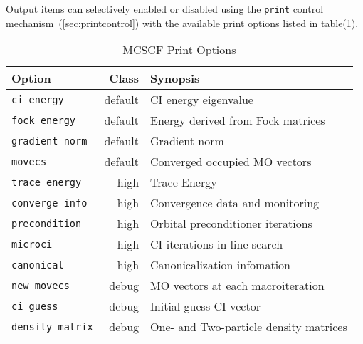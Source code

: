 Output items can selectively enabled or disabled using the
\verb+print+ control mechanism~(\ref{sec:printcontrol}) with the
available print options listed in table(\ref{MCSCF_print_options}).

\begin{table}
\caption{MCSCF Print Options}
\label{MCSCF_print_options}
\vspace{.2in}
\begin{tabular}{lrl}
\hline\hline
Option                          & Class    &  Synopsis \\
\hline
\verb+ci energy+                & default  &  CI energy eigenvalue \\
\verb+fock energy+              & default  &  Energy derived from Fock matrices \\
\verb+gradient norm+            & default  &  Gradient norm \\
\verb+movecs+                   & default  &  Converged occupied MO vectors \\
\verb+trace energy+             & high     &  Trace Energy \\
\verb+converge info+            & high     &  Convergence data and monitoring \\
\verb+precondition+             & high     &  Orbital preconditioner iterations \\
\verb+microci+                  & high     &  CI iterations in line search \\
\verb+canonical+                & high     &  Canonicalization infomation \\
\verb+new movecs+               & debug    &  MO vectors at each macroiteration \\
\verb+ci guess+                 & debug    &  Initial guess CI vector \\
\verb+density matrix+           & debug    &  One- and Two-particle density matrices \\
\hline\hline
\end{tabular}
\end{table}
